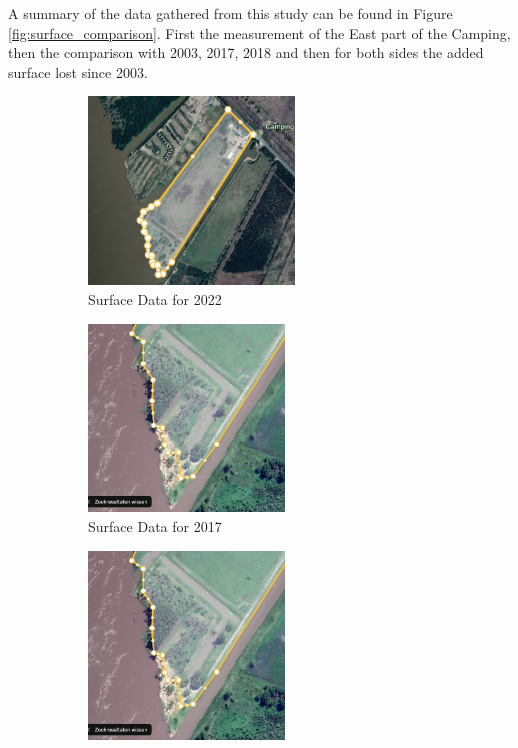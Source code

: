 A summary of the data gathered from this study can be found in Figure \ref{fig:surface_comparison}. First the measurement of the East part of the Camping, then the comparison with 2003, 2017, 2018 and then for both sides the added surface lost since 2003.

\begin{figure}[H]
    \centering
    \begin{subfigure}[b]{0.45\textwidth} %
        \includegraphics[width=\linewidth, height=5cm]{figures/appendix-g/opp2022.png}
        \caption{Surface Data for 2022}
        \label{fig:surface2022.2}
    \end{subfigure}
    \hfill
    \begin{subfigure}[b]{0.45\textwidth} %
        \includegraphics[width=\linewidth, height=5cm]{figures/appendix-g/opp2017.png}
        \caption{Surface Data for 2017}
        \label{fig:surface2017}
    \end{subfigure}
    \hfill
    \begin{subfigure}[b]{0.45\textwidth} %
        \includegraphics[width=\linewidth, height=5cm]{figures/appendix-g/opp2018.png}

\end{subfigure}
\end{figure}
